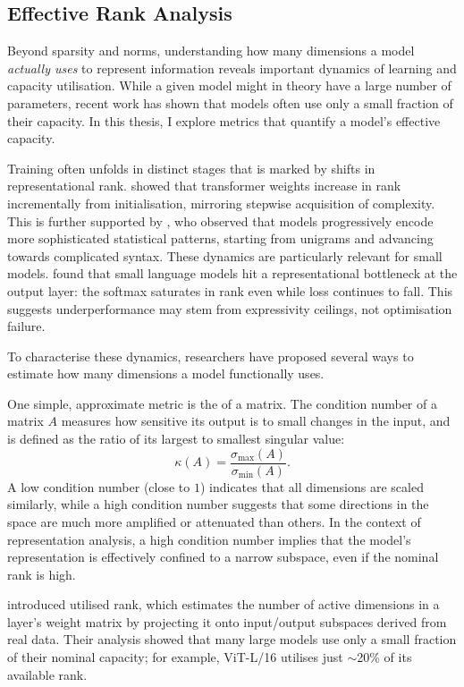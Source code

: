 \subsection{Effective Rank Analysis}

Beyond sparsity and norms, understanding how many dimensions a model \textit{actually uses} to represent information reveals important dynamics of learning and capacity utilisation. While a given model might in theory have a large number of parameters, recent work has shown that models often use only a small fraction of their capacity. In this thesis, I explore metrics that quantify a model's effective capacity.

Training often unfolds in distinct stages that is marked by shifts in representational rank. \citet{boix-adsera2023rank} showed that transformer weights increase in rank incrementally from initialisation, mirroring stepwise acquisition of complexity. This is further supported by \citet{belrose2024neural}, who observed that models progressively encode more sophisticated statistical patterns, starting from unigrams and advancing towards complicated syntax. These dynamics are particularly relevant for small models. \citet{godey2024small} found that small language models hit a representational bottleneck at the output layer: the softmax saturates in rank even while loss continues to fall. This suggests underperformance may stem from expressivity ceilings, not optimisation failure.

To characterise these dynamics, researchers have proposed several ways to estimate how many dimensions a model functionally uses. 

One simple, approximate metric is the  of a matrix. The condition number of a matrix $A$ measures how sensitive its output is to small changes in the input, and is defined as the ratio of its largest to smallest singular value:
\[
\kappa(A) = \frac{\sigma_{\max}(A)}{\sigma_{\min}(A)}.
\]
A low condition number (close to $1$) indicates that all dimensions are scaled similarly, while a high condition number suggests that some directions in the space are much more amplified or attenuated than others. In the context of representation analysis, a high condition number implies that the model's representation is effectively confined to a narrow subspace, even if the nominal rank is high.

\citet{garg2025utilizedrank} introduced utilised rank, which estimates the number of active dimensions in a layer's weight matrix by projecting it onto input/output subspaces derived from real data. Their analysis showed that many large models use only a small fraction of their nominal capacity; for example, ViT-L/16 utilises just $\sim$20\% of its available rank.

